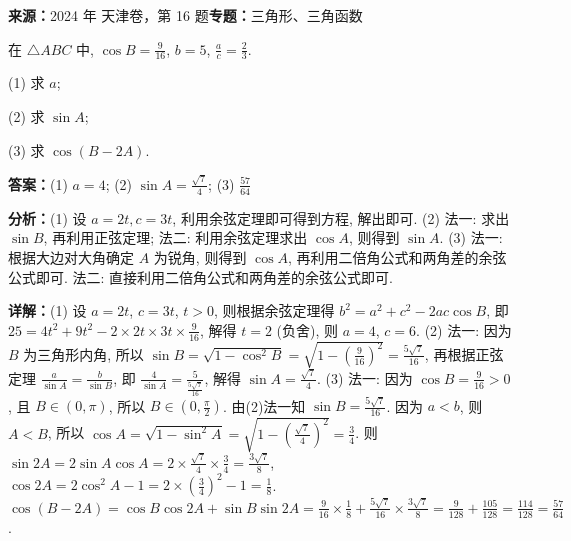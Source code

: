 \begin{question}[points=14]
\textbf{来源：}2024 年 天津卷，第 16 题\quad \textbf{专题：}三角形、三角函数\par
在 $\triangle ABC$ 中, $\cos B = \frac{9}{16}$, $b=5$, $\frac{a}{c}=\frac{2}{3}$.

(1) 求 $a$;

(2) 求 $\sin A$;

(3) 求 $\cos(B-2A)$.
\begin{solution}
\textbf{答案：}(1) $a=4$; (2) $\sin A = \frac{\sqrt{7}}{4}$; (3) $\frac{57}{64}$

\textbf{分析：}(1) 设 $a=2t,c=3t$, 利用余弦定理即可得到方程, 解出即可. (2) 法一: 求出 $\sin B$, 再利用正弦定理; 法二: 利用余弦定理求出 $\cos A$, 则得到 $\sin A$. (3) 法一: 根据大边对大角确定 $A$ 为锐角, 则得到 $\cos A$, 再利用二倍角公式和两角差的余弦公式即可. 法二: 直接利用二倍角公式和两角差的余弦公式即可.

\textbf{详解：}(1) 设 $a=2t$, $c=3t$, $t>0$, 则根据余弦定理得 $b^2=a^2+c^2-2ac\cos B$, 即 $25=4t^2+9t^2-2\times2t\times3t\times\frac{9}{16}$, 解得 $t=2$ (负舍), 则 $a=4$, $c=6$.
(2) 法一: 因为 $B$ 为三角形内角, 所以 $\sin B = \sqrt{1-\cos^2 B} = \sqrt{1-\left(\frac{9}{16}\right)^2} = \frac{5\sqrt{7}}{16}$, 再根据正弦定理 $\frac{a}{\sin A}=\frac{b}{\sin B}$, 即 $\frac{4}{\sin A}=\frac{5}{\frac{5\sqrt{7}}{16}}$, 解得 $\sin A = \frac{\sqrt{7}}{4}$.
(3) 法一: 因为 $\cos B=\frac{9}{16}>0$, 且 $B\in(0,\pi)$, 所以 $B\in(0,\frac{\pi}{2})$. 由(2)法一知 $\sin B=\frac{5\sqrt{7}}{16}$. 因为 $a<b$, 则 $A<B$, 所以 $\cos A=\sqrt{1-\sin^2 A}=\sqrt{1-\left(\frac{\sqrt{7}}{4}\right)^2}=\frac{3}{4}$. 则 $\sin2A=2\sin A\cos A=2\times\frac{\sqrt{7}}{4}\times\frac{3}{4}=\frac{3\sqrt{7}}{8}$, $\cos2A=2\cos^2 A-1=2\times\left(\frac{3}{4}\right)^2-1=\frac{1}{8}$. $\cos(B-2A)=\cos B\cos2A+\sin B\sin2A=\frac{9}{16}\times\frac{1}{8}+\frac{5\sqrt{7}}{16}\times\frac{3\sqrt{7}}{8}=\frac{9}{128}+\frac{105}{128}=\frac{114}{128}=\frac{57}{64}$.
\end{solution}
\end{question}

